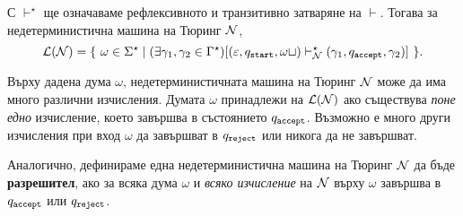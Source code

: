 С $\vdash^\star$ ще означаваме рефлексивното и транзитивно затваряне на $\vdash$.
Тогава за недетерминистична машина на Тюринг $\mathcal{N}$, 
\[\mathcal{L}(\mathcal{N}) = \{\ \omega\in\Sigma^\star \mid (\exists \gamma_1,\gamma_2 \in \Gamma^\star)[(\varepsilon, q_{\texttt{start}}, \omega\sqcup) \vdash^\star_{\mathcal{N}} (\gamma_1, q_{\texttt{accept}}, \gamma_2) ]\ \}.\]

\begin{remark}
  Върху дадена дума $\omega$, недетерминистичната машина на Тюринг $\mathcal{N}$ може да има много различни изчисления.
  Думата $\omega$ принадлежи на $\mathcal{L}(\mathcal{N})$ ако съществува {\em поне едно} изчисление, което завършва в състоянието $q_{\texttt{accept}}$.
  Възможно е много други изчисления при вход $\omega$ да завършват в $q_{\texttt{reject}}$ или никога да не завършват.
\end{remark}

Аналогично, дефинираме една недетерминистична машина на Тюринг $\mathcal{N}$ да бъде {\bf разрешител}, ако за всяка дума $\omega$ и 
\emph{всяко изчисление} на $\mathcal{N}$ върху $\omega$ завършва в $q_{\texttt{accept}}$ или $q_{\texttt{reject}}$.


